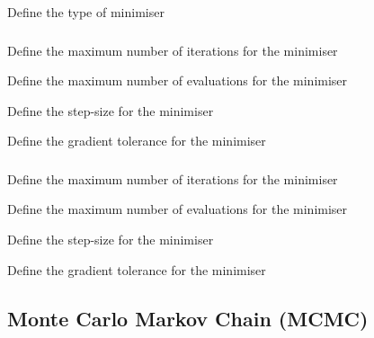 
 {Define the type of minimiser}

\subsubsection[Numerical differences minimiser]{} 

 {Define the maximum number of iterations for the minimiser}

 {Define the maximum number of evaluations for the minimiser}

 {Define the step-size for the minimiser}

 {Define the gradient tolerance for the minimiser}

\subsubsection[Differential evolution minimiser]{} 

 {Define the maximum number of iterations for the minimiser}

 {Define the maximum number of evaluations for the minimiser}

 {Define the step-size for the minimiser}

 {Define the gradient tolerance for the minimiser}

\subsection{Monte Carlo Markov Chain (MCMC)}

